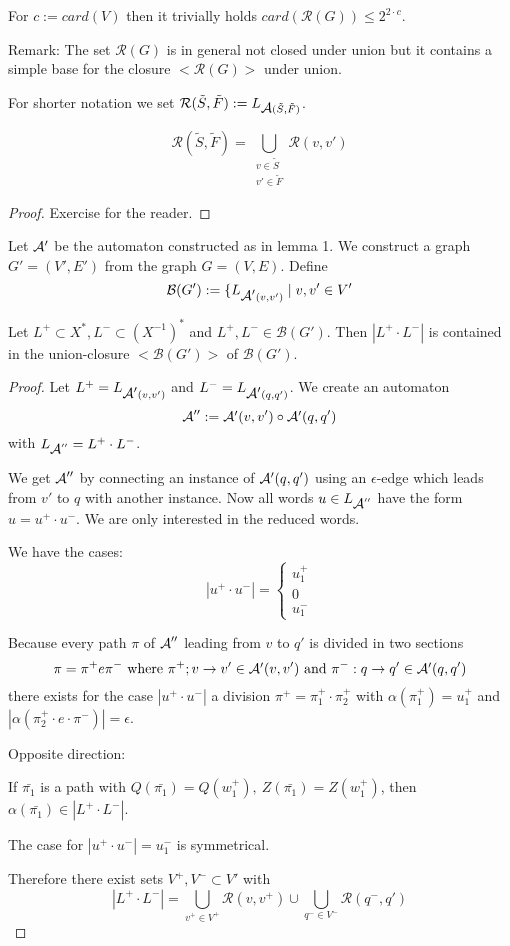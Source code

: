 For $c := card(V)$ then it trivially holds $card(\mathcal{R}(G)) \leq 2^{2
\cdot c}$.

Remark: The set $\mathcal{R}(G)$ is in general not closed under union but it
contains a simple base for the closure $<\mathcal{R}(G)>$ under union.

For shorter notation we set $\mathcal{R}(\tilde{S},\tilde{F}) :=
L_{\mbox{$\mathcal{A}$}(\tilde{S},\tilde{F})}$.

\begin{lemma}
\[ \mathcal{R}(\tilde{S},\tilde{F}) = \bigcup_{\substack{v \in \tilde{S}\\v'
\in \tilde{F}}} \mathcal{R}(v, v') \]
\end{lemma}

\begin{proof}
Exercise for the reader.
\end{proof}

Let $\mbox{$\mathcal{A'}$}$ be the automaton constructed as in lemma 1. We construct a graph
$G' = (V', E')$ from the graph $G = (V, E)$. Define
\[ \mathcal{B}(G') := \{ L_{\mbox{$\mathcal{A'}$}(v, v')} \mid v, v' \in V' \]

\begin{lemma}
Let $L^+ \subset X^*, L^- \subset (X^{-1})^*$ and $L^+, L^- \in
\mathcal{B}(G')$. Then $|L^+ \cdot L^-|$ is contained in the union-closure
$<\mathcal{B}(G')>$ of $\mathcal{B}(G')$.
\end{lemma}

\begin{proof}
Let $L^+ = L_{\mbox{$\mathcal{A'}$}(v, v')}$ and $L^- = L_{\mbox{$\mathcal{A'}$}(q, q')}$. We create an
automaton
\[ \mbox{$\mathcal{A}$}'' := \mbox{$\mathcal{A'}$}(v, v') \circ \mbox{$\mathcal{A'}$}(q, q') \]
with $L_{\mbox{$\mathcal{A}$}''} = L^+ \cdot L^-$.

We get $\mbox{$\mathcal{A}$}''$ by connecting an instance of $\mbox{$\mathcal{A'}$}(q, q')$ using an
$\epsilon$-edge which leads from $v'$ to $q$ with another instance. Now all
words $u \in L_{\mbox{$\mathcal{A}$}''}$ have the form $u = u^+ \cdot u^-$. We are only
interested in the reduced words.

We have the cases:
\[ |u^+ \cdot u^-| = \begin{cases} u_1^+ \\ 0 \\ u_1^- \end{cases} \]

Because every path $\pi$ of $\mbox{$\mathcal{A}$}''$ leading from $v$ to $q'$ is divided in
two sections
\[ \pi = \pi^+ e \pi^- \text{ where }\pi^+; v \to v' \in \mbox{$\mathcal{A'}$}(v, v') \text{
and }\pi^- : q \to q' \in \mbox{$\mathcal{A'}$}(q, q') \]
there exists for the case $|u^+ \cdot u^-|$ a division $\pi^+ = \pi_1^+ \cdot
\pi_2^+$ with $\alpha(\pi_1^+) = u_1^+$ and $|\alpha(\pi_2^+ \cdot e \cdot
\pi^-)| = \epsilon$.

Opposite direction:

If $\bar{\pi_1}$ is a path with $Q(\bar{\pi_1}) = Q(w_1^+),\ Z(\bar{\pi_1}) =
Z(w_1^+)$, then $\alpha(\bar{\pi_1}) \in |L^+ \cdot L^-|$.

The case for $|u^+ \cdot u^-| = u_1^-$ is symmetrical.

Therefore there exist sets $V^+, V^- \subset V'$ with
\[ |L^+ \cdot L^-| = \bigcup_{v^+ \in V^+} \mathcal{R}(v, v^+) \cup
\bigcup_{q^- \in V^-} \mathcal{R}(q^-, q') \]
\end{proof}

